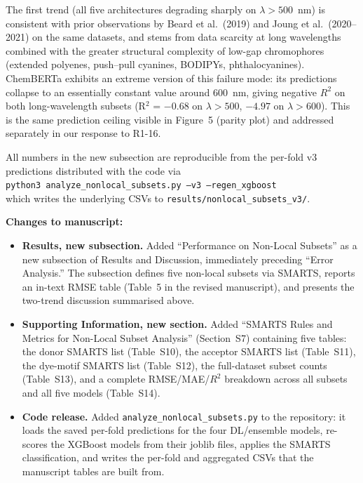 \documentclass[11pt]{article}
\newenvironment{changes}{%
  \noindent\textbf{Changes to manuscript:}
  \begin{itemize}[leftmargin=2em,itemsep=2pt]}{%
  \end{itemize}\medskip}
\begin{document}
{The first trend (all five architectures degrading sharply on $\lambda > 500$~nm) is consistent with prior observations by Beard et al.\ (2019) and Joung et al.\ (2020--2021) on the same datasets, and stems from data scarcity at long wavelengths combined with the greater structural complexity of low-gap chromophores (extended polyenes, push--pull cyanines, BODIPYs, phthalocyanines). ChemBERTa exhibits an extreme version of this failure mode: its predictions collapse to an essentially constant value around 600~nm, giving negative $R^2$ on both long-wavelength subsets (R$^2$ = $-0.68$ on $\lambda > 500$, $-4.97$ on $\lambda > 600$). This is the same prediction ceiling visible in Figure~5 (parity plot) and addressed separately in our response to R1-16.

All numbers in the new subsection are reproducible from the per-fold v3 predictions distributed with the code via\\
\hspace*{1em}\texttt{python3 analyze\_nonlocal\_subsets.py --v3 --regen\_xgboost}\\
which writes the underlying CSVs to \texttt{results/nonlocal\_subsets\_v3/}.}

\begin{changes}
  \item \textbf{Results, new subsection.} Added ``Performance on Non-Local Subsets'' as a new subsection of Results and Discussion, immediately preceding ``Error Analysis.'' The subsection defines five non-local subsets via SMARTS, reports an in-text RMSE table (Table~5 in the revised manuscript), and presents the two-trend discussion summarised above.
  \item \textbf{Supporting Information, new section.} Added ``SMARTS Rules and Metrics for Non-Local Subset Analysis'' (Section~S7) containing five tables: the donor SMARTS list (Table~S10), the acceptor SMARTS list (Table~S11), the dye-motif SMARTS list (Table~S12), the full-dataset subset counts (Table~S13), and a complete RMSE/MAE/$R^2$ breakdown across all subsets and all five models (Table~S14).
  \item \textbf{Code release.} Added \texttt{analyze\_nonlocal\_subsets.py} to the repository: it loads the saved per-fold predictions for the four DL/ensemble models, re-scores the XGBoost models from their joblib files, applies the SMARTS classification, and writes the per-fold and aggregated CSVs that the manuscript tables are built from.
\end{changes}
\end{document}
